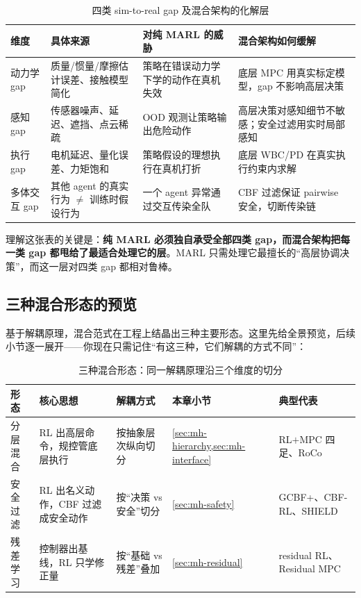 \begin{table}[H]\centering\small
\caption{四类 sim-to-real gap 及混合架构的化解层}
\label{tab:mh-gap}
\begin{tabular}{p{2.0cm}p{3.6cm}p{3.2cm}p{3.4cm}}
\toprule
维度 & 具体来源 & 对纯 MARL 的威胁 & 混合架构如何缓解 \\
\midrule
动力学 gap & 质量/惯量/摩擦估计误差、接触模型简化 & 策略在错误动力学下学的动作在真机失效 & 底层 MPC 用真实标定模型，gap 不影响高层决策 \\
感知 gap & 传感器噪声、延迟、遮挡、点云稀疏 & OOD 观测让策略输出危险动作 & 高层决策对感知细节不敏感；安全过滤用实时局部感知 \\
执行 gap & 电机延迟、量化误差、力矩饱和 & 策略假设的理想执行在真机打折 & 底层 WBC/PD 在真实执行约束内求解 \\
多体交互 gap & 其他 agent 的真实行为 $\ne$ 训练时假设行为 & 一个 agent 异常通过交互传染全队 & CBF 过滤保证 pairwise 安全，切断传染链 \\
\bottomrule
\end{tabular}
\end{table}

\noindent 理解这张表的关键是：\textbf{纯 MARL 必须独自承受全部四类 gap，而混合架构把每一类 gap 都甩给了最适合处理它的层}。MARL 只需处理它最擅长的“高层协调决策”，而这一层对四类 gap 都相对鲁棒。

\subsection{三种混合形态的预览}
\label{sec:mh-three-forms}

基于解耦原理，混合范式在工程上结晶出三种主要形态。这里先给全景预览，后续小节逐一展开——你现在只需记住“有这三种，它们解耦的方式不同”：

\begin{table}[H]\centering\small
\caption{三种混合形态：同一解耦原理沿三个维度的切分}
\label{tab:mh-forms}
\begin{tabular}{p{2.4cm}p{3.4cm}p{2.8cm}p{2.0cm}p{2.4cm}}
\toprule
形态 & 核心思想 & 解耦方式 & 本章小节 & 典型代表 \\
\midrule
分层混合 & RL 出高层命令，规控管底层执行 & 按抽象层次纵向切分 & \cref{sec:mh-hierarchy,sec:mh-interface} & RL$+$MPC 四足、RoCo \\
安全过滤 & RL 出名义动作，CBF 过滤成安全动作 & 按“决策 vs 安全”切分 & \cref{sec:mh-safety} & GCBF+、CBF-RL、SHIELD \\
残差学习 & 控制器出基线，RL 只学修正量 & 按“基础 vs 残差”叠加 & \cref{sec:mh-residual} & residual RL、Residual MPC \\
\bottomrule
\end{tabular}
\end{table}

